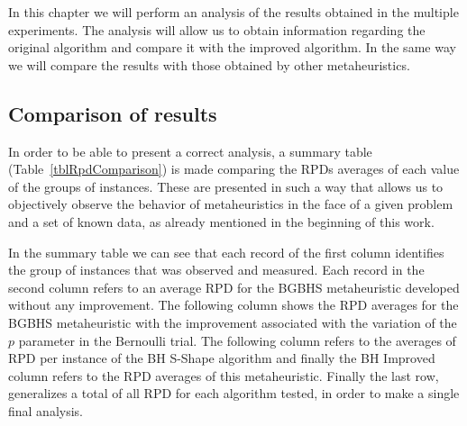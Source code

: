 In this chapter we will perform an analysis of the results obtained in the multiple experiments. The analysis will allow us to obtain information regarding the original algorithm and compare it with the improved algorithm. In the same way we will compare the results with those obtained by other metaheuristics.

\subsection{Comparison of results}
In order to be able to present a correct analysis, a summary table (Table~\ref{tblRpdComparison}) is made comparing the RPDs averages of each value of the groups of instances. These are presented in such a way that allows us to objectively observe the behavior of metaheuristics in the face of a given problem and a set of known data, as already mentioned in the beginning of this work.

In the summary table we can see that each record of the first column identifies the group of instances that was observed and measured. Each record in the second column refers to an average RPD for the BGBHS metaheuristic developed without any improvement. The following column shows the RPD averages for the BGBHS metaheuristic with the improvement associated with the variation of the $ p $ parameter in the Bernoulli trial. The following column refers to the averages of RPD per instance of the BH S-Shape algorithm and finally the BH Improved column refers to the RPD averages of this metaheuristic. Finally the last row, generalizes a total of all RPD for each algorithm tested, in order to make a single final analysis.

